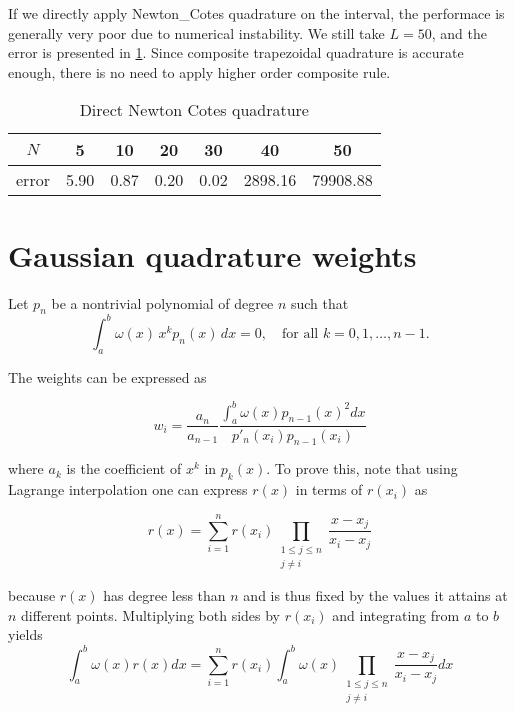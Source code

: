 \documentclass[conference,onecolumn,12pt]{IEEEtran}
\theoremstyle{definition}
\begin{document}
If we directly apply Newton\_Cotes quadrature on the interval, the performace is generally very poor due to numerical instability. We still take $L=50$, and the error is presented in \ref{directcotes}. Since composite trapezoidal quadrature is accurate enough, there is no need to apply higher order composite rule.
\begin{table}[!htbp]
    \centering
    \begin{tabular}{ccccccc}
        \toprule
        $N$&5&10&20&30&40&50\\
        \midrule
        error&5.90&0.87&0.20&0.02&2898.16&79908.88\\
        \bottomrule
    \end{tabular}
    \caption{Direct Newton Cotes quadrature}
    \label{directcotes}
\end{table}

\appendices
\section{Gaussian quadrature weights}
\label{appendixA}
Let $p_n$ be a nontrivial polynomial of degree $n$ such that
\begin{equation}
    \int_a^b \omega(x) \, x^k p_n(x) \, dx = 0, \quad \text{for all } k = 0, 1, \ldots, n - 1.
\end{equation}

The weights can be expressed as

\begin{equation}
    \label{eqnote1}
    w_{i} = \frac{a_{n}}{a_{n-1}}\frac{\int_{a}^{b}\omega(x)p_{n-1}\left(x\right)^{2}dx}{p'_{n}(x_{i})p_{n-1}(x_{i})}
\end{equation}

where $a_{k}$ is the coefficient of $x^{k}$ in $p_{k}(x)$. To prove this, note that using Lagrange interpolation one can express $r(x)$ in terms of $r(x_{i})$ as

\begin{equation}
r(x) = \sum_{i=1}^{n}r(x_{i})\prod_{\begin{smallmatrix}1\leq j\leq n\\j\neq i\end{smallmatrix}}\frac{x-x_{j}}{x_{i}-x_{j}}
\end{equation}

because $r(x)$ has degree less than $n$ and is thus fixed by the values it attains at $n$ different points. Multiplying both sides by $r(x_i)$ and integrating from $a$ to $b$ yields
\begin{equation}
\int_{a}^{b}\omega(x)r(x)dx= \sum_{i=1}^{n}r(x_{i})\int_{a}^{b}\omega(x)\prod_{\begin{smallmatrix}1\leq j\leq n\\j\neq i\end{smallmatrix}}\frac{x-x_{j}}{x_{i}-x_{j}}dx
\end{equation}
\end{document}
